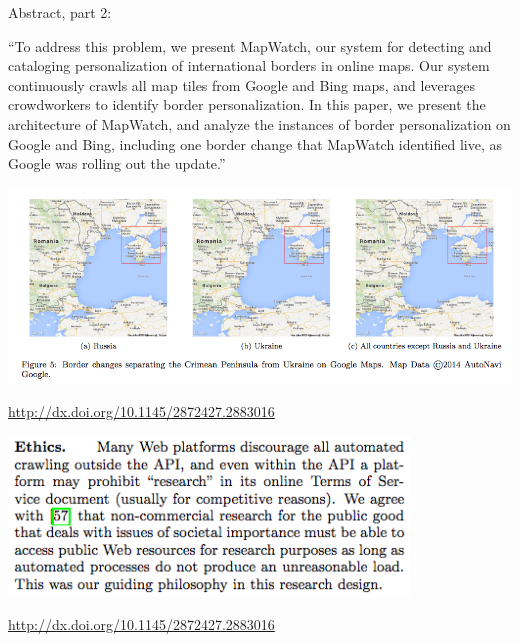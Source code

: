 \documentclass{beamer}
\def\vf{\vfill}
\begin{document}
\begin{frame}

Abstract, part 2:\\
\vspace{1mm}
\begin{small}
``To address this problem, we present MapWatch, our system for detecting and cataloging personalization of international borders in online maps. Our system continuously crawls all map tiles from Google and Bing maps, and leverages crowdworkers to identify border personalization. In this paper, we present the architecture of MapWatch, and analyze the instances of border personalization on Google and Bing, including one border change that MapWatch identified live, as Google was rolling out the update.''
\end{small}
\end{frame}
\begin{frame}

\begin{center}
\includegraphics[width=\textwidth]{figures/soeller_mapwatch_2016_fig5.png}
\end{center}

\vf
\url{http://dx.doi.org/10.1145/2872427.2883016}
\end{frame}
\begin{frame}

\begin{center}
\includegraphics[width=0.8\textwidth]{figures/soeller_mapwatch_2016_ethics.png}
\end{center}

\vf
\url{http://dx.doi.org/10.1145/2872427.2883016}
\end{frame}
\end{document}
